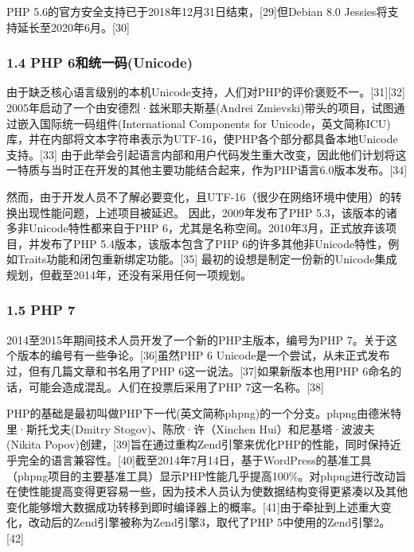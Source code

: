 PHP 5.6的官方安全支持已于2018年12月31日结束，[29]但Debian 8.0 Jessies将支持延长至2020年6月。[30]
\subsubsection{1.4 PHP 6和统一码(Unicode)}
由于缺乏核心语言级别的本机Unicode支持，人们对PHP的评价褒贬不一。[31][32] 2005年启动了一个由安德烈·兹米耶夫斯基(Andrei Zmievski)带头的项目，试图通过嵌入国际统一码组件(International Components for Unicode，英文简称ICU)库，并在内部将文本字符串表示为UTF-16，使PHP各个部分都具备本地Unicode支持。[33] 由于此举会引起语言内部和用户代码发生重大改变，因此他们计划将这一特质与当时正在开发的其他主要功能结合起来，作为PHP语言6.0版本发布。[34]

然而，由于开发人员不了解必要变化，且UTF-16（很少在网络环境中使用）的转换出现性能问题，上述项目被延迟。 因此，2009年发布了PHP 5.3，该版本的诸多非Unicode特性都来自于PHP 6，尤其是名称空间。2010年3月，正式放弃该项目，并发布了PHP 5.4版本，该版本包含了PHP 6的许多其他非Unicode特性，例如Traits功能和闭包重新绑定功能。[35] 最初的设想是制定一份新的Unicode集成规划，但截至2014年，还没有采用任何一项规划。
\subsubsection{1.5 PHP 7}
2014至2015年期间技术人员开发了一个新的PHP主版本，编号为PHP 7。关于这个版本的编号有一些争论。[36]虽然PHP 6 Unicode是一个尝试，从未正式发布过，但有几篇文章和书名用了PHP 6这一说法。[37]如果新版本也用PHP 6命名的话，可能会造成混乱。人们在投票后采用了PHP 7这一名称。[38]

PHP的基础是最初叫做PHP下一代(英文简称phpng)的一个分支。phpng由德米特里·斯托戈夫(Dmitry Stogov)、陈欣·许（Xinchen Hui）和尼基塔·波波夫(Nikita Popov)创建，[39]旨在通过重构Zend引擎来优化PHP的性能，同时保持近乎完全的语言兼容性。[40]截至2014年7月14日，基于WordPress的基准工具（phpng项目的主要基准工具）显示PHP性能几乎提高100\%。对phpng进行改动旨在使性能提高变得更容易一些，因为技术人员认为使数据结构变得更紧凑以及其他变化能够增大数据成功转移到即时编译器上的概率。[41]由于牵扯到上述重大变化，改动后的Zend引擎被称为Zend引擎3，取代了PHP 5中使用的Zend引擎2。[42]

